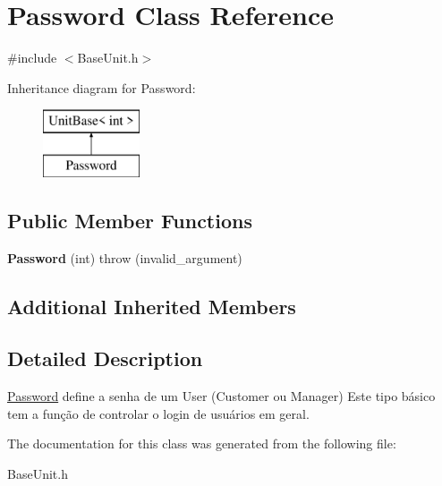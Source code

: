 \hypertarget{classPassword}{\section{Password Class Reference}
\label{classPassword}
}


{\ttfamily \#include $<$Base\-Unit.\-h$>$}

Inheritance diagram for Password\-:\begin{figure}[H]
\begin{center}
\leavevmode
\includegraphics[height=2.000000cm]{classPassword}
\end{center}
\end{figure}
\subsection*{Public Member Functions}
\begin{DoxyCompactItemize}
\item 
\hypertarget{classPassword_a3bd047af975e01295f877bf590007cab}{{\bfseries Password} (int)  throw (invalid\-\_\-argument)}\label{classPassword_a3bd047af975e01295f877bf590007cab}

\end{DoxyCompactItemize}
\subsection*{Additional Inherited Members}


\subsection{Detailed Description}
\hyperlink{classPassword}{Password} define a senha de um User (Customer ou Manager) Este tipo básico tem a função de controlar o login de usuários em geral. 

The documentation for this class was generated from the following file\-:\begin{DoxyCompactItemize}
\item 
Base\-Unit.\-h\end{DoxyCompactItemize}
